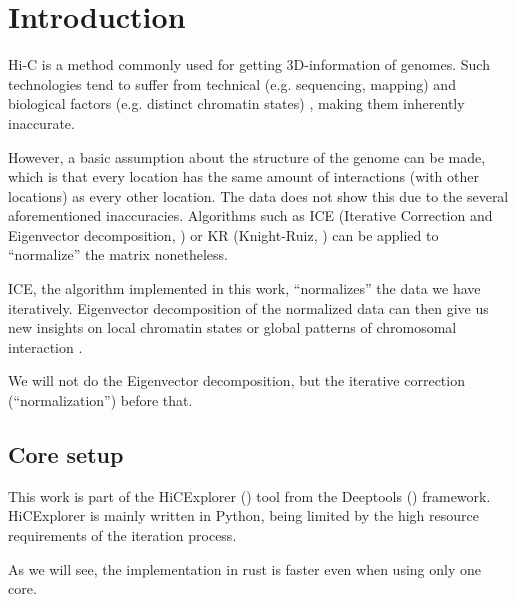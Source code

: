 \chapter{Introduction}\label{chap:introduction}

Hi-C is a method commonly used for getting 3D-information of genomes. Such
technologies tend to suffer from technical (e.g. sequencing, mapping)
\cite{pmid21646344} and biological factors (e.g. distinct chromatin states)
\cite{pmid19693276}, making them inherently inaccurate.

However, a basic assumption about the structure of the genome can be made,
which is that every location has the same amount of interactions (with other
locations) as every other location. The data does not show this due to the
several aforementioned inaccuracies. Algorithms such as ICE (Iterative
Correction and Eigenvector decomposition, ) or KR (Knight-Ruiz,
) can be applied to ``normalize'' the matrix nonetheless.

ICE, the algorithm implemented in this work, ``normalizes'' the data we
have iteratively. Eigenvector decomposition of the normalized data can then
give us new insights on local chromatin states or global patterns of
chromosomal interaction \cite{imakaev2012iterative}.

We will not do the Eigenvector decomposition, but the iterative correction
(``normalization'') before that.


\section{Core setup}\label{sec:setup}

This work is part of the HiCExplorer () tool from the
Deeptools () framework. HiCExplorer is mainly written in
Python, being limited by the high resource requirements of the iteration process.

As we will see, the implementation in rust is faster even when using only one
core.





